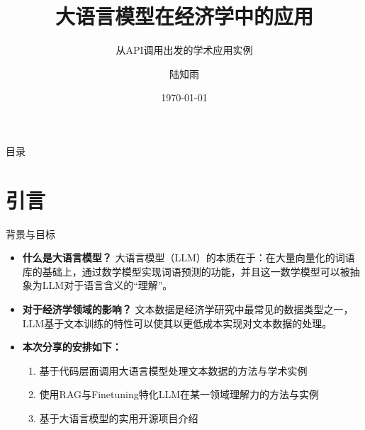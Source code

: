 \documentclass{beamer}
\title[LLMs in Economics]{\textbf{大语言模型在经济学中的应用}}
\subtitle{从API调用出发的学术应用实例}
\author{陆知雨}
\institute{中国财政协同发展研究中心\\
\vspace{2mm}财政学基地班22}
\date{\today}
\begin{document}
\begin{frame}
  \titlepage
\end{frame}

\begin{frame}{目录}
    \tableofcontents[hideallsubsections]
\end{frame}

\section{引言}
\begin{frame}{背景与目标}
  \begin{itemize}
    \item \textbf{什么是大语言模型？} 大语言模型（LLM）的本质在于：在大量向量化的词语库的基础上，通过数学模型实现词语预测的功能，并且这一数学模型可以被抽象为LLM对于语言含义的“理解”。
    \item \textbf{对于经济学领域的影响？} 文本数据是经济学研究中最常见的数据类型之一，LLM基于文本训练的特性可以使其以更低成本实现对文本数据的处理。
    \item \textbf{本次分享的安排如下：}
      \begin{enumerate}
        \item 基于代码层面调用大语言模型处理文本数据的方法与学术实例
        \item 使用RAG与Finetuning特化LLM在某一领域理解力的方法与实例
        \item 基于大语言模型的实用开源项目介绍
      \end{enumerate}
  \end{itemize}
\end{frame}

\end{document}
